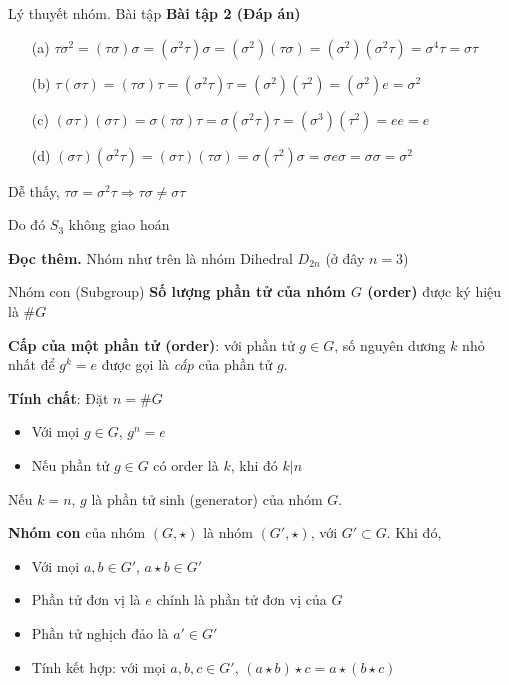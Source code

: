 \documentclass{beamer}
\begin{document}
\begin{frame}{Lý thuyết nhóm. Bài tập}
    \textbf{Bài tập 2 (Đáp án)}
    \begin{enumerate}
        \item [(a)] $\tau\sigma^2 = (\tau\sigma)\sigma=(\sigma^2\tau)\sigma = (\sigma^2)(\tau\sigma)=(\sigma^2)(\sigma^2\tau)=\sigma^4\tau=\sigma\tau$
        \item [(b)] $\tau(\sigma\tau)=(\tau\sigma)\tau = (\sigma^2\tau)\tau=(\sigma^2)(\tau^2)=(\sigma^2)e=\sigma^2$
        \item [(c)] $(\sigma\tau)(\sigma\tau) = \sigma(\tau\sigma)\tau = \sigma(\sigma^2\tau)\tau=(\sigma^3)(\tau^2)=e e = e$
        \item [(d)] $(\sigma\tau)(\sigma^2\tau)=(\sigma\tau)(\tau\sigma)=\sigma(\tau^2)\sigma=\sigma e \sigma = \sigma \sigma = \sigma^2$
    \end{enumerate}
    Dễ thấy, $\tau\sigma = \sigma^2\tau \Rightarrow \tau\sigma \neq \sigma\tau$
    
    Do đó $S_3$ không giao hoán
    
    \textbf{Đọc thêm.} Nhóm như trên là nhóm Dihedral $D_{2n}$ (ở đây $n=3$)
\end{frame}

\begin{frame}{Nhóm con (Subgroup)}
    \textbf{Số lượng phần tử của nhóm $G$ (order)} được ký hiệu là $\# G$ \pause
    
    \textbf{Cấp của một phần tử (order)}: với phần tử $g \in G$, số nguyên dương $k$ nhỏ nhất để $g^k = e$ được gọi là \textit{cấp} của phần tử $g$. \pause
    
    \textbf{Tính chất}: Đặt $n = \# G$
    \begin{itemize}
        \item Với mọi $g \in G$, $g^n = e$
        \item Nếu phần tử $g \in G$ có order là $k$, khi đó $k | n$
    \end{itemize} \pause
    
    Nếu $k = n$, $g$ là phần tử sinh (generator) của nhóm $G$. \pause

    \textbf{Nhóm con} của nhóm $(G, \star)$ là nhóm $(G', \star)$, với $G' \subset G$. Khi đó,
    \begin{itemize}
        \item Với mọi $a, b \in G'$, $a \star b \in G'$
        \item Phần tử đơn vị là $e$ chính là phần tử đơn vị của $G$
        \item Phần tử nghịch đảo là $a' \in G'$
        \item Tính kết hợp: với mọi $a, b, c \in G'$, $(a \star b) \star c = a \star (b \star c)$
    \end{itemize}
\end{frame}
\end{document}
